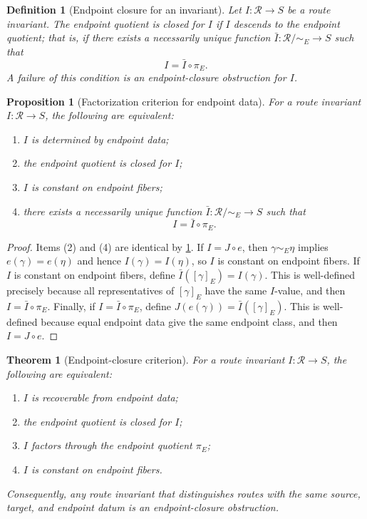 \documentclass[12pt]{article}
\newtheorem{theorem}{Theorem}[section]
\newtheorem{proposition}[proposition]{Proposition}
\newtheorem{definition}[definition]{Definition}
\newcommand{\calR}{\mathcal{R}}
\begin{document}
\begin{definition}[Endpoint closure for an invariant]
\label{def:endpoint-closure}
Let $I:\calR\to S$ be a route invariant. The endpoint quotient is
\emph{closed for $I$} if $I$ descends to the endpoint quotient; that is,
if there exists a necessarily unique function
$\bar I:\calR/{\sim_E}\to S$ such that
\[
  I=\bar I\circ\pi_E.
\]
A failure of this condition is an \emph{endpoint-closure obstruction} for
$I$.
\end{definition}

\begin{proposition}[Factorization criterion for endpoint data]
\label{prop:factorization}
For a route invariant $I:\calR\to S$, the following are equivalent:
\begin{enumerate}
\item $I$ is determined by endpoint data;
\item the endpoint quotient is closed for $I$;
\item $I$ is constant on endpoint fibers;
\item there exists a necessarily unique function
$\bar I:\calR/{\sim_E}\to S$ such that
\[
  I=\bar I\circ\pi_E.
\]
\end{enumerate}
\end{proposition}

\begin{proof}
Items (2) and (4) are identical by \cref{def:endpoint-closure}. If
$I=J\circ e$, then $\gamma\sim_E\eta$ implies
$e(\gamma)=e(\eta)$ and hence $I(\gamma)=I(\eta)$, so $I$ is constant on
endpoint fibers. If $I$ is
constant on endpoint fibers, define $\bar I([\gamma]_E)=I(\gamma)$. This
is well-defined precisely because all representatives of $[\gamma]_E$
have the same $I$-value, and then $I=\bar I\circ\pi_E$. Finally, if
$I=\bar I\circ\pi_E$, define $J(e(\gamma))=\bar I([\gamma]_E)$. This is
well-defined because equal endpoint data give the same endpoint class,
and then $I=J\circ e$.
\end{proof}

\begin{theorem}[Endpoint-closure criterion]
\label{thm:endpoint-ceiling}
For a route invariant $I:\calR\to S$, the following are equivalent:
\begin{enumerate}
\item $I$ is recoverable from endpoint data;
\item the endpoint quotient is closed for $I$;
\item $I$ factors through the endpoint quotient $\pi_E$;
\item $I$ is constant on endpoint fibers.
\end{enumerate}
Consequently, any route invariant that distinguishes routes with the
same source, target, and endpoint datum is an endpoint-closure
obstruction.
\end{theorem}
\end{document}
